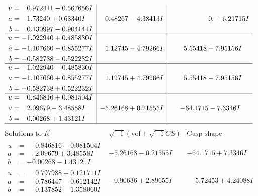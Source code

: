 \documentclass[1p]{elsarticle_modified}
\theoremstyle{definition}
\newcommand{\I}{\sqrt{-1}}
\begin{document}
$$\begin{array}{c|c|c}
\begin{aligned}
u &= \phantom{-}0.972411 - 0.567656 I \\
a &= \phantom{-}1.73240 + 0.63340 I \\
b &= \phantom{-}0.130997 - 0.904141 I\end{aligned}
 & \phantom{-}0.48267 - 4.38413 I & \phantom{-0.000000 -}0. + 6.21715 I \\ \hline\begin{aligned}
u &= -1.022940 + 0.485830 I \\
a &= -1.107660 - 0.855277 I \\
b &= -0.582738 - 0.522232 I\end{aligned}
 & \phantom{-}1.12745 - 4.79266 I & \phantom{-}5.55418 + 7.95156 I \\ \hline\begin{aligned}
u &= -1.022940 - 0.485830 I \\
a &= -1.107660 + 0.855277 I \\
b &= -0.582738 + 0.522232 I\end{aligned}
 & \phantom{-}1.12745 + 4.79266 I & \phantom{-}5.55418 - 7.95156 I \\ \hline\begin{aligned}
u &= \phantom{-}0.846816 + 0.081504 I \\
a &= \phantom{-}2.09679 - 3.48558 I \\
b &= -0.00268 + 1.43121 I\end{aligned}
 & -5.26168 + 0.21555 I & -64.1715 - 7.3346 I\\
 \hline 
 \end{array}$$\newpage$$\begin{array}{c|c|c}  
\text{Solutions to }I^u_{2}& \I (\text{vol} + \sqrt{-1}CS) & \text{Cusp shape}\\
 \hline 
\begin{aligned}
u &= \phantom{-}0.846816 - 0.081504 I \\
a &= \phantom{-}2.09679 + 3.48558 I \\
b &= -0.00268 - 1.43121 I\end{aligned}
 & -5.26168 - 0.21555 I & -64.1715 + 7.3346 I \\ \hline\begin{aligned}
u &= \phantom{-}0.797988 + 0.121711 I \\
a &= \phantom{-}0.786447 - 0.612142 I \\
b &= \phantom{-}0.137852 - 1.358060 I\end{aligned}
 & -0.90636 + 2.89655 I & \phantom{-}5.72453 + 4.24088 I \\ \hline\begin{aligned}

\end{aligned}
\end{array}$$
\end{document}
